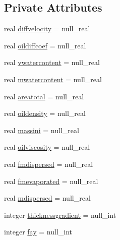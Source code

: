 \subsection*{Private Attributes}
\begin{DoxyCompactItemize}
\item 
real \mbox{\hyperlink{structmodulelagrangianglobal_1_1t__externalvar_ae2d1c254385af43e0b3642c1b92a3734}{diffvelocity}} = null\+\_\+real
\item 
real \mbox{\hyperlink{structmodulelagrangianglobal_1_1t__externalvar_aea88c361f8bcb24d1d04ee9b78ecc07c}{oildiffcoef}} = null\+\_\+real
\item 
real \mbox{\hyperlink{structmodulelagrangianglobal_1_1t__externalvar_ae51610c3915b13ea2ad1793166963d8d}{vwatercontent}} = null\+\_\+real
\item 
real \mbox{\hyperlink{structmodulelagrangianglobal_1_1t__externalvar_a31b8d7e41c61292517f40f0f4f2427f8}{mwatercontent}} = null\+\_\+real
\item 
real \mbox{\hyperlink{structmodulelagrangianglobal_1_1t__externalvar_a46f6501e4669329516dd34e53e99fef7}{areatotal}} = null\+\_\+real
\item 
real \mbox{\hyperlink{structmodulelagrangianglobal_1_1t__externalvar_a17c119062ae19e1489d7a1da54664fed}{oildensity}} = null\+\_\+real
\item 
real \mbox{\hyperlink{structmodulelagrangianglobal_1_1t__externalvar_aa2f6c38320d9a6379890142ebe0a72b4}{massini}} = null\+\_\+real
\item 
real \mbox{\hyperlink{structmodulelagrangianglobal_1_1t__externalvar_a6d0c7f954db73222356baf90580912fa}{oilviscosity}} = null\+\_\+real
\item 
real \mbox{\hyperlink{structmodulelagrangianglobal_1_1t__externalvar_aa0f5df8c0528a1c71d976023e65a0988}{fmdispersed}} = null\+\_\+real
\item 
real \mbox{\hyperlink{structmodulelagrangianglobal_1_1t__externalvar_a26aff3a1ef87ca11ca6e040098b9b8a6}{fmevaporated}} = null\+\_\+real
\item 
real \mbox{\hyperlink{structmodulelagrangianglobal_1_1t__externalvar_a459f64e66559b0397291f546a2202a6f}{mdispersed}} = null\+\_\+real
\item 
integer \mbox{\hyperlink{structmodulelagrangianglobal_1_1t__externalvar_a861b511e77f9267cd63f80b50ce5b75c}{thicknessgradient}} = null\+\_\+int
\item 
integer \mbox{\hyperlink{structmodulelagrangianglobal_1_1t__externalvar_ad15f73fbfb64de47baa5e99a537f55af}{fay}} = null\+\_\+int

\end{DoxyCompactItemize}
